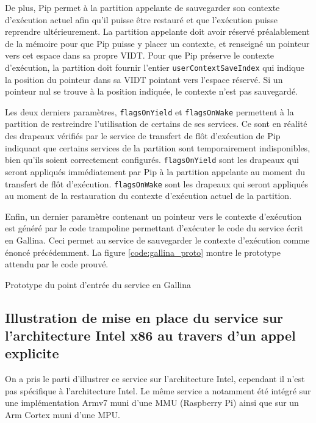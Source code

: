 	De plus, Pip permet à la partition appelante de sauvegarder son contexte d'exécution actuel afin qu'il puisse être restauré et que l'exécution puisse reprendre ultérieurement. La partition appelante doit avoir réservé préalablement de la mémoire pour que Pip puisse y placer un contexte, et renseigné un pointeur vers cet espace dans sa propre VIDT. Pour que Pip préserve le contexte d'exécution, la partition doit fournir l'entier \texttt{userContextSaveIndex} qui indique la position du pointeur dans sa VIDT pointant vers l'espace réservé. Si un pointeur nul se trouve à la position indiquée, le contexte n'est pas sauvegardé.

	Les deux derniers paramètres, \texttt{flagsOnYield} et \texttt{flagsOnWake} permettent à la partition de restreindre l'utilisation de certains de ses services. Ce sont en réalité des drapeaux vérifiés par le service de transfert de flôt d'exécution de Pip indiquant que certains services de la partition sont temporairement indisponibles, bien qu'ils soient correctement configurés. \texttt{flagsOnYield} sont les drapeaux qui seront appliqués immédiatement par Pip à la partition appelante au moment du transfert de flôt d'exécution. \texttt{flagsOnWake} sont les drapeaux qui seront appliqués au moment de la restauration du contexte d'exécution actuel de la partition.

	Enfin, un dernier paramètre contenant un pointeur vers le contexte d'exécution est généré par le code trampoline permettant d'exécuter le code du service écrit en Gallina. Ceci permet au service de sauvegarder le contexte d'exécution comme énoncé précédemment. La figure \ref{code:gallina_proto} montre le prototype attendu par le code prouvé.

		\begin{listing}[!ht]
			\caption{Prototype du point d'entrée du service en Gallina}
			\label{code:gallina_proto}
		\end{listing}
		
		\subsection{Illustration de mise en place du service sur l'architecture Intel x86 au travers d'un appel explicite}

		On a pris le parti d'illustrer ce service sur l'architecture Intel, cependant il n'est pas spécifique à l'architecture Intel. Le même service a notamment été intégré sur une implémentation Armv7 muni d'une MMU (Raspberry Pi) ainsi que sur un Arm Cortex muni d'une MPU.


